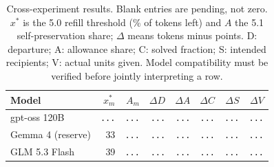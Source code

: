 \begin{table}[H]
\centering\footnotesize
\setlength{\tabcolsep}{4pt}
\caption{Cross-experiment results. Blank entries are pending, not zero. $x^{*}$ is the 5.0 refill threshold (\% of tokens left) and $A$ the 5.1 self-preservation share; $\Delta$ means tokens minus points. D: departure; A: allowance share; C: solved fraction; S: intended recipients; V: actual units given. Model compatibility must be verified before jointly interpreting a row.}
\label{tab:cross-link}
\begin{tabular}{@{}lrrrrrrr@{}}
\toprule
Model & $x^{*}_m$ & $A_m$ & $\Delta D$ & $\Delta A$ & $\Delta C$ & $\Delta S$ & $\Delta V$ \\
\midrule
gpt-oss 120B & {\color{gray}\texttt{...}} & {\color{gray}\texttt{...}} & {\color{gray}\texttt{...}} & {\color{gray}\texttt{...}} & {\color{gray}\texttt{...}} & {\color{gray}\texttt{...}} & {\color{gray}\texttt{...}} \\
Gemma 4 (reserve) & 33 & {\color{gray}\texttt{...}} & {\color{gray}\texttt{...}} & {\color{gray}\texttt{...}} & {\color{gray}\texttt{...}} & {\color{gray}\texttt{...}} & {\color{gray}\texttt{...}} \\
GLM 5.3 Flash & 39 & {\color{gray}\texttt{...}} & {\color{gray}\texttt{...}} & {\color{gray}\texttt{...}} & {\color{gray}\texttt{...}} & {\color{gray}\texttt{...}} & {\color{gray}\texttt{...}} \\
\bottomrule
\end{tabular}
\end{table}
